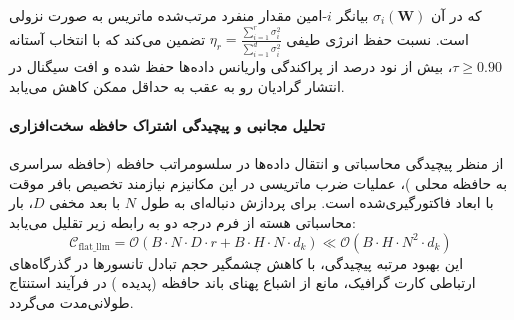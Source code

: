 که در آن $\sigma_i(\mathbf{W})$ بیانگر $i$-امین مقدار منفرد مرتب‌شده ماتریس به صورت نزولی است. نسبت حفظ انرژی طیفی $\eta_r = \frac{\sum_{i=1}^r \sigma_i^2}{\sum_{i=1}^{d} \sigma_i^2}$ تضمین می‌کند که با انتخاب آستانه $\tau \ge 0.90$، بیش از نود درصد از پراکندگی واریانس داده‌ها حفظ شده و افت سیگنال در انتشار گرادیان رو به عقب به حداقل ممکن کاهش می‌یابد.

\paragraph{تحلیل مجانبی و پیچیدگی اشتراک حافظه سخت‌افزاری}
از منظر پیچیدگی محاسباتی و انتقال داده‌ها در سلسومراتب حافظه (حافظه سراسری  به حافظه محلی )، عملیات ضرب ماتریسی در این مکانیزم نیازمند تخصیص بافر موقت با ابعاد فاکتورگیری‌شده است. برای پردازش دنباله‌ای به طول $N$ با بعد مخفی $D$، بار محاسباتی هسته از فرم درجه دو به رابطه زیر تقلیل می‌یابد:
\begin{equation}
\label{eq:complexity_flat_llm}
\mathcal{C}_{\text{flat\_llm}} = \mathcal{O}\left( B \cdot N \cdot D \cdot r + B \cdot H \cdot N \cdot d_k \right) \ll \mathcal{O}\left( B \cdot H \cdot N^2 \cdot d_k \right)
\end{equation}
این بهبود مرتبه پیچیدگی، با کاهش چشمگیر حجم تبادل تانسورها در گذرگاه‌های ارتباطی کارت گرافیک، مانع از اشباع پهنای باند حافظه (پدیده ) در فرآیند استنتاج طولانی‌مدت می‌گردد.
